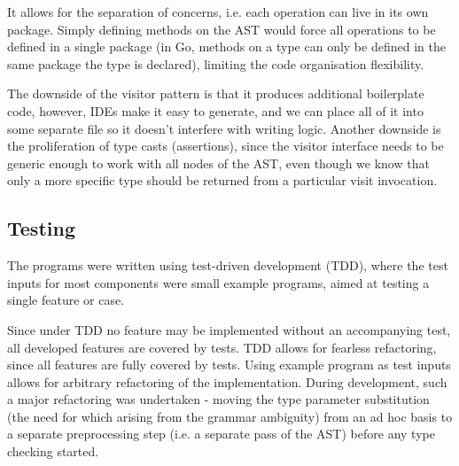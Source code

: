 
It allows for the separation of concerns, i.e. each operation can live in its
own package. Simply defining methods on the AST would force all operations to be
defined in a single package (in Go, methods on a type can only be defined in the
same package the type is declared), limiting the code organisation flexibility.


The downside of the visitor pattern is that it produces additional boilerplate
code, however, IDEs make it easy to generate, and we can place all of it into
some separate file so it doesn't interfere with writing logic. Another downside
is the proliferation of type casts (assertions), since the visitor interface
needs to be generic enough to work with all nodes of the AST, even though we
know that only a more specific type should be returned from a particular visit
invocation.

\subsection{Testing}

The programs were written using test-driven development (TDD), where the test
inputs for most components were small example programs, aimed at testing a
single feature or case.

Since under TDD no feature may be implemented without an accompanying test, all
developed features are covered by tests. TDD allows for fearless refactoring,
since all features are fully covered by tests. Using example program as test
inputs allows for arbitrary refactoring of the implementation. During
development, such a major refactoring was undertaken - moving the type parameter
substitution (the need for which arising from the grammar ambiguity) from an ad
hoc basis to a separate preprocessing step (i.e. a separate pass of the AST)
before any type checking started.

